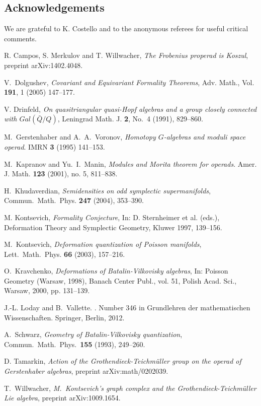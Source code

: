 \documentclass{amsart}
\theoremstyle{plain}
\theoremstyle{definition}
\begin{document}
\subsection*{Acknowledgements} We are grateful to K. Costello and to the anonymous referees for useful critical comments.

\begin{thebibliography}{10}

 R. Campos, S. Merkulov and T. Willwacher, {\em The Frobenius properad is Koszul}, preprint arXiv:1402.4048.

 V.\ Dolgushev, {\em Covariant and Equivariant Formality Theorems},
Adv. Math., Vol. {\bf 191}, 1 (2005) 147--177.

V. Drinfeld, {\em On quasitriangular quasi-Hopf algebras and a group closely connected
with $Gal(\bar{Q}/Q)$}, Leningrad Math. J. {\bf 2}, No.\ 4 (1991),  829--860.

 M.\ Gerstenhaber and A.~A.\ Voronov, {\em Homotopy $G$-algebras and moduli space operad}. IMRN {\bf 3} (1995) 141--153.

 M.\ Kapranov and Yu.~I.\ Manin, {\em Modules and Morita theorem for operads}. Amer. J. Math. {\bf 123} (2001), no. 5, 811--838.

 H.\ Khudaverdian, {\em Semidensities on odd symplectic supermanifolds},
 Commun.\ Math.\ Phys. {\bf 247} (2004), 353--390.

  M. Kontsevich, {\em Formality Conjecture}, In: D. Sternheimer et al. (eds.),
Deformation Theory and Symplectic
Geometry, Kluwer 1997, 139--156.

 M.\ Kontsevich, {\em Deformation quantization
 of Poisson manifolds}, Lett.\ Math.\ Phys. {\bf 66} (2003), 157--216.

 O.\ Kravchenko, {\em Deformations of Batalin-Vilkovisky algebras}, In: Poisson Geometry
 (Warsaw, 1998), Banach Center Publ.,
vol. 51, Polish Acad. Sci., Warsaw, 2000, pp. 131--139.

J.-L. Loday and B.~Vallette.
.
\newblock Number 346 in {Grundlehren der mathematischen Wissenschaften}.
  {Springer, Berlin}, {2012}.

 A.\ Schwarz, {\em Geometry of Batalin-Vilkovisky quantization},
Commun.\ Math.\ Phys.\
{\bf 155} (1993), 249--260.

D. Tamarkin, {\em Action of the Grothendieck-Teichm\"uller group on the operad of
  Gerstenhaber algebras}, preprint arXiv:math/0202039.

 T.\ Willwacher, {\em M.\ Kontsevich's graph complex and the Grothendieck-Teichm\"uller Lie algebra},
preprint arXiv:1009.1654.

 \end{thebibliography}
\end{document}
